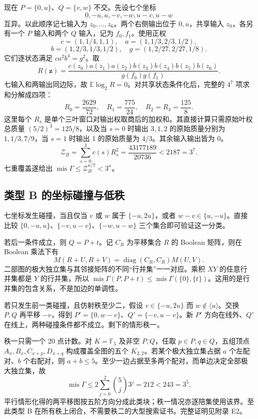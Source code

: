 \documentclass[11pt]{ctexart}
\begin{document}
现在 \(P=\{0,u\}\)、\(Q=\{v,w\}\) 不交。先设七个坐标
\[
 0,-u,u,-v,-w,u-v,u-w
\]
互异。以此顺序记七输入为 \(z_0,\ldots,z_6\)。两个右侧输出位于 \(0,u\)，共享输入 \(z_0\)，各另有一个 \(P\) 输入和两个 \(Q\) 输入，记为 \(f_0,f_1\)。使用正权
\[
 c=(1,1/4,1,1),\quad a=(1,1/3,2/3,1/2),
\]
\[
 b=(1,2/3,1/3,1/2),\quad g=(1,2/27,2/27,1/8).
\]
它们逐状态满足 \(ca^2b^4=g^2\)。取
\[
 R(\boldsymbol z)=
 \frac{c(z_0)a(z_1)a(z_2)b(z_3)b(z_4)b(z_5)b(z_6)}
 {g(f_0)g(f_1)}.
\]
七输入和两输出同边际，故 \(\mathbb E\log_2R=0\)。对共享状态条件化后，完整的 \(4^7\) 项求和分解成四项：
\[
 R_0=\frac{2629}{72},\quad R_1=\frac{775}{24},\quad
 R_2=R_3=\frac{125}{8}.
\]
这里每个 \(R_s\) 是单个三叶窗口对输出权取商后的加权和。其直接计算只需原始叶权总质量 \((5/2)^3=125/8\)，以及当 \(s=0\) 时输出 \(3,1,2\) 的原始质量分别为 \(1,1/3,7/9\)，当 \(s=1\) 时输出 1 的原始质量为 \(4/3\)。其余输入输出皆为 0。
\[
 \mathcal Z_B=\sum_{s=0}^3c(s)R_s^2
 =\frac{43177189}{20736}<2187=3^7.
\]
七重覆盖遂给出 \(\operatorname{mis}\Gamma\le\mathcal Z_B^{\kappa/7}<3^\kappa\)。

\subsection{类型 B 的坐标碰撞与低秩}

七坐标发生碰撞，当且仅当 \(v\) 或 \(w\) 属于 \(\{-u,2u\}\)，或者 \(w-v\in\{u,-u\}\)。直接比较 \(\{0,-u,u\}\)、\(\{-v,u-v\}\)、\(\{-w,u-w\}\) 三个集合即可验证这一分类。

若后一条件成立，则 \(Q=P+t\)。记 \(C_R\) 为平移集合 \(R\) 的 Boolean 矩阵，则在 Boolean 乘法下有
\[
 M(R+U,R+V)=\operatorname{diag}(C_R,C_R)M(U,V).
\]
二部图的极大独立集与其邻接矩阵的不同“行并集”一一对应。乘积 \(XY\) 的任意行并集都是 \(Y\) 的行并集，所以 \(\operatorname{mis}\Gamma(P,P+t)\le\operatorname{mis}\Gamma(\{0\},\{t\})\)。这用的是行并集的包含关系，不是加边的单调性。

若只发生前一类碰撞，且仿射秩至少二，假设 \(v\in\{-u,2u\}\) 而 \(w\notin\langle u\rangle\)。交换 \(P,Q\) 再平移 \(-v\)，得到 \(P'=\{0,w-v\}\)、\(Q'=\{-v,u-v\}\)。新 \(P'\) 方向在线外、\(Q'\) 在线上，两种碰撞条件都不成立。剩下的情形秩一。

秩一只需一个 20 点计数。对 \(K=\mathbb F_5\) 及非空 \(P,Q\)，任取 \(p\in P,q\in Q\)，五组顶点 \(A_x,B_x,C_{x+p},D_{x+q}\) 构成覆盖全图的五个 \(K_{2,2}\)。若某个极大独立集占据 \(a\) 个左配对、\(b\) 个右配对，则 \(a+b\le5\)。至少一边占据至多两个配对，而单边决定全部极大独立集，故
\[
 \operatorname{mis}\Gamma\le2\sum_{j=0}^{2}\binom{5}{j}3^j
 =212<243=3^5.
\]
平行情形化得的两平移图按五阶方向分成此类块；秩一情况亦逐陪集使用该界。至此类型 B 在所有秩上闭合，不需要秩二的大型搜索证书。完整证明见附录 E2。
\end{document}
